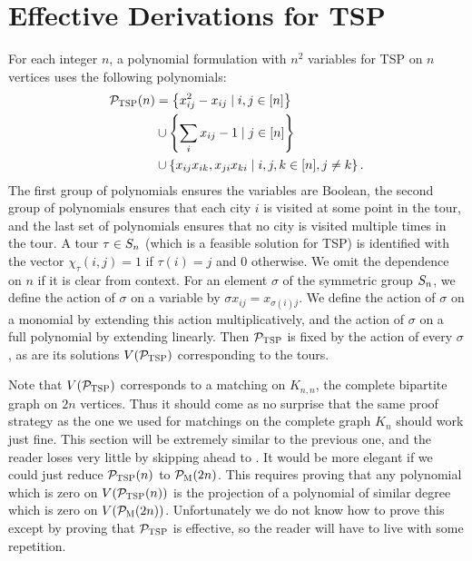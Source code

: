 \section{Effective Derivations for \textsc{TSP}}

For each integer $n$, a polynomial formulation with $n^2$ variables for \textsc{TSP} on $n$ vertices uses the following polynomials:
\begin{align}
\label{eq:tsp-formulation}\mathcal P_{\textsc{TSP}}(n) &= \left\{x_{ij}^2 - x_{ij} \mid i,j \in [n]\right\} \\ &\cup \left\{\sum_i x_{ij} - 1 \mid j \in [n]\right\} \nonumber \\ &\cup \left\{x_{ij}x_{ik}, x_{ji}x_{ki} \mid i,j,k \in [n], j \neq k\right\} \nonumber.
\end{align}
The first group of polynomials ensures the variables are Boolean, the second group of polynomials ensures that each city $i$ is visited at some point in the tour, and the last set of polynomials ensures that no city is visited multiple times in the tour. A tour $\tau \in S_{n}$ (which is a feasible solution for \textsc{TSP}) is identified with the vector $\chi_\tau(i,j) = 1$ if $\tau(i) = j$ and $0$ otherwise. We omit the dependence on $n$ if it is clear from context. For an element $\sigma$ of the symmetric group $S_{n}$, we define the action of $\sigma$ on a variable by $\sigma x_{ij} = x_{\sigma(i)j}$.
We define the action of $\sigma$ on a monomial by extending this action multiplicatively, and the action of $\sigma$ on a full polynomial by extending linearly.
Then $\mathcal P_{\textsc{TSP}}$ is fixed by the action of every $\sigma$, as are its solutions $V(\mathcal P_{\textsc{TSP}})$ corresponding to the tours. 

Note that $V(\mathcal P_{\textsc{TSP}})$ corresponds to a matching on $K_{n,n}$, the complete bipartite graph on $2n$ vertices. Thus it should come as no surprise that the same proof strategy as the one we used for matchings on the complete graph $K_n$ should work just fine. This section will be extremely similar to the previous one, and the reader loses very little by skipping ahead to . It would be more elegant if we could just reduce $\mathcal P_{\textsc{TSP}}(n)$ to $\mathcal P_{\textsc{M}}(2n)$. This requires proving that any polynomial which is zero on $V(\mathcal P_{\textsc{TSP}}(n))$ is the projection of a polynomial of similar degree which is zero on $V(\mathcal P_{\textsc{M}}(2n))$. Unfortunately we do not know how to prove this except by proving that $\mathcal P_{\textsc{TSP}}$ is effective, so the reader will have to live with some repetition. 

